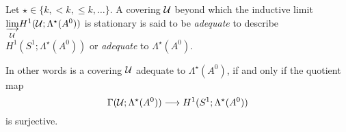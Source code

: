 \begin{defn}
  \begin{comment}
    \begin{enumerate}
    \item \cite[371]{Martinet1991} defines adapted coverings
    \item \cite[5269]{Loday2004} defines acyclic coverings
      \begin{itemize}
      \item uses the \textbf{theorem of Leray}
        \url{https://de.wikipedia.org/wiki/Satz_von_Leray}
      \end{itemize}
    \end{enumerate}
  \end{comment}
  Let $\star\in\{k,<k,\leq k,\dots\}$.
  A covering $\mathcal{U}$ beyond which the inductive limit
  $\underset{\mathcal{U}}{\underrightarrow{\lim}}H^1(\mathcal{U};\Lambda^\star(A^0))$ is
  stationary is said to be \emph{adequate} to describe
  $H^1(S^1;\Lambda^\star(A^0))$ or \emph{adequate} to $\Lambda^\star(A^0)$.
  \begin{comment}
    A covering $\cU$ is said to be \emph{adequate} to describe
    $H^1(S^1;\Lambda^\star(A^0))$ or \emph{adequate} to $\Lambda^\star(A^0)$ if
    for every element in
    $\underset{\cU}{\underrightarrow{\lim}}H^1(\cU;\Lambda^\star(A^0))$
    given by some covering $\cU'$ and an element of
    $\Gamma(\cU';\Lambda^\star(A^0))$
    there exists
    \begin{itemize}
      \item an element in $\Gamma(\cU;\Lambda^\star(A^0))$ and
      \item an common refinement of $\cU$ and $\cU'$
    \end{itemize}
    such that \PROBLEM[the elements are~?? on the refined covering.]
  \end{comment}

  In other words is a covering $\mathcal{U}$ adequate to $\Lambda^\star(A^0)$, if and
  only if the quotient map
  \[
      \Gamma(\mathcal{U};\Lambda^\star(A^0))\longrightarrow H^1(S^1;\Lambda^\star(A^0))
  \]
  is surjective.
  \begin{comment}
    \cite[371]{Martinet1991} introduces the following definition
    \begin{s-defn}
      A covering $\cU$ is \emph{adapted} if every anti-Stokes direction is
      contained in exactly one element of the nerve $\dot\cU$.
    \end{s-defn}
  \end{comment}
\end{defn}
